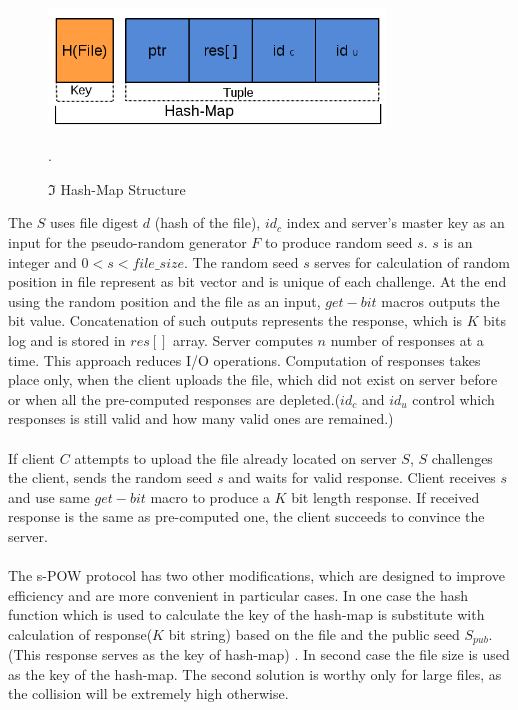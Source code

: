 \documentclass[12pt]{article}
\begin{document}
\begin{figure}[ht] 
\begin{center}
\includegraphics[width=0.8\textwidth]{Di_Pietro_Hash_Map}
\caption{$\Im$ Hash-Map Structure}
\label{fig:Di_Pietro_Hash_Map} .
\end{center}
\end{figure}

The $S$ uses file digest $d$ (hash of the file), $id_c$ index and server's master key as an input for the  pseudo-random generator $F$ to produce random seed $s$. $s$ is an integer and $0 < s < file\_size $. The random seed $s$ serves for calculation of random position in file represent as bit vector and is unique of each challenge. At the end  using the random  position and the file as an input, $get-bit$ macros outputs the bit value. Concatenation of such outputs represents the response, which is $K$ bits log and is stored in $res[]$ array. Server computes $n$ number of responses at a time. This approach reduces I/O operations. Computation of responses takes place only, when the client uploads the file, which did not exist on server before or when  all the pre-computed responses are depleted.($id_c$ and $id_u$ control which responses is still valid and how many valid ones are remained.)\\\\
If client $C$ attempts to upload the file already located on server $S$, $S$ challenges the client, sends the random seed $s$ and waits for valid response. Client receives $s$ and use same $get-bit$ macro to produce a $K$ bit length response. If received response is the same as pre-computed one, the client succeeds to convince the server.\\\\
The s-POW protocol has two other modifications, which are designed to improve efficiency and are more convenient in particular cases. In one case the hash function which is used to calculate the key of the hash-map is substitute with calculation of response($K$ bit string) based on the file and the public seed $S_{pub}$. (This response serves as the key of hash-map) . In second case the file size is used as the key of the hash-map. The second solution is worthy only for large files, as the collision will be extremely high otherwise.
\end{document}
